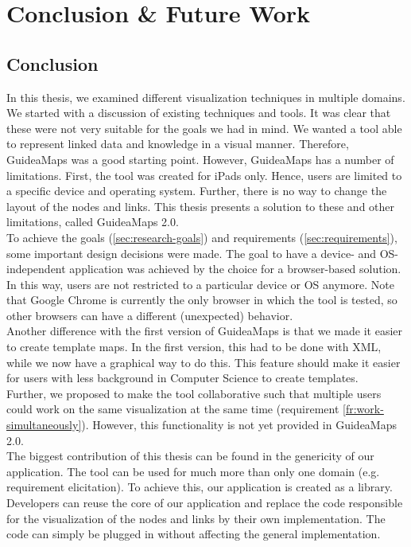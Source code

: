 \chapter{Conclusion \& Future Work}\label{ch:conclusion-future-work}
\vspace{-1mm}
\section{Conclusion}\label{sec:conclusion}
In this thesis, we examined different visualization techniques in multiple domains. We started with a discussion of existing techniques and tools. It was clear that these were not very suitable for the goals we had in mind. We wanted a tool able to represent linked data and knowledge in a visual manner. Therefore, GuideaMaps was a good starting point. However, GuideaMaps has a number of limitations. First, the tool was created for iPads only. Hence, users are limited to a specific device and operating system. Further, there is no way to change the layout of the nodes and links. This thesis presents a solution to these and other limitations, called GuideaMaps 2.0.\\

To achieve the goals (\autoref{sec:research-goals}) and requirements (\autoref{sec:requirements}), some important design decisions were made. The goal to have a device- and OS-independent application was achieved by the choice for a browser-based solution. In this way, users are not restricted to a particular device or OS anymore. Note that Google Chrome is currently the only browser in which the tool is tested, so other browsers can have a different (unexpected) behavior.\\

Another difference with the first version of GuideaMaps is that we made it easier to create template maps. In the first version, this had to be done with XML, while we now have a graphical way to do this. This feature should make it easier for users with less background in Computer Science to create templates.\\

Further, we proposed to make the tool collaborative such that multiple users could work on the same visualization at the same time (requirement \ref{fr:work-simultaneously}). However, this functionality is not yet provided in GuideaMaps 2.0.\\

The biggest contribution of this thesis can be found in the genericity of our application. The tool can be used for much more than only one domain (e.g. requirement elicitation). To achieve this, our application is created as a library. Developers can reuse the core of our application and replace the code responsible for the visualization of the nodes and links by their own implementation. The code can simply be plugged in without affecting the general implementation.\\


